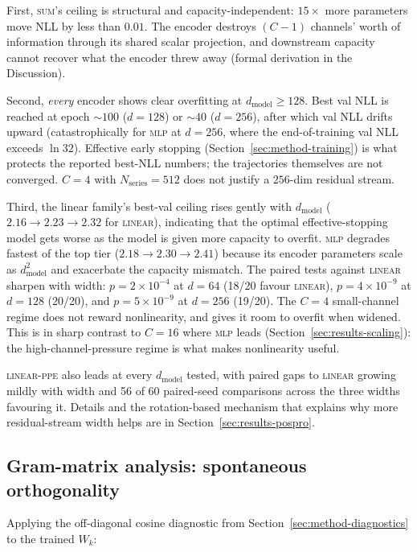 \documentclass[11pt]{article}
\begin{document}
First, \textsc{sum}'s ceiling is structural and
capacity-independent: $15{\times}$ more parameters move NLL by
less than $0.01$. The encoder destroys $(C{-}1)$ channels' worth
of information through its shared scalar projection, and
downstream capacity cannot recover what the encoder threw away
(formal derivation in the Discussion).

Second, \emph{every} encoder shows clear overfitting at
$d_{\text{model}} \ge 128$. Best val NLL is reached at epoch
$\sim$$100$ ($d{=}128$) or $\sim$$40$ ($d{=}256$), after which val
NLL drifts upward (catastrophically for \textsc{mlp} at $d{=}256$,
where the end-of-training val NLL exceeds $\ln 32$). Effective early
stopping (Section~\ref{sec:method-training}) is what protects the
reported best-NLL numbers; the trajectories themselves are not
converged. $C{=}4$ with $N_{\text{series}}{=}512$ does not justify a
$256$-dim residual stream.

Third, the linear family's best-val ceiling rises gently with
$d_{\text{model}}$ ($2.16 \to 2.23 \to 2.32$ for \textsc{linear}),
indicating that the optimal effective-stopping model gets worse as
the model is given more capacity to overfit. \textsc{mlp} degrades
fastest of the top tier ($2.18 \to 2.30 \to 2.41$) because its
encoder parameters scale as $d_{\text{model}}^2$ and exacerbate the
capacity mismatch. The paired tests against \textsc{linear} sharpen
with width: $p{=}2{\times}10^{-4}$ at $d{=}64$ (18/20 favour
\textsc{linear}), $p{=}4{\times}10^{-9}$ at $d{=}128$ (20/20), and
$p{=}5{\times}10^{-9}$ at $d{=}256$ (19/20). The $C{=}4$
small-channel regime does not reward nonlinearity, and gives it room
to overfit when widened. This is in sharp contrast to $C{=}16$ where
\textsc{mlp} leads (Section~\ref{sec:results-scaling}): the
high-channel-pressure regime is what makes nonlinearity useful.

\textsc{linear-ppe} also leads at every $d_{\text{model}}$
tested, with paired gaps to \textsc{linear} growing mildly with
width and 56 of 60 paired-seed comparisons across the three
widths favouring it. Details and the rotation-based mechanism
that explains why more residual-stream width helps are in
Section~\ref{sec:results-pospro}.

\subsection{Gram-matrix analysis: spontaneous orthogonality}
\label{sec:results-gram}

Applying the off-diagonal cosine diagnostic from
Section~\ref{sec:method-diagnostics} to the trained $W_k$:
\end{document}
